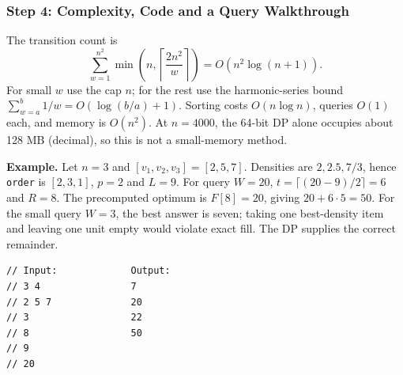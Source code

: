 \subsubsection*{Step 4: Complexity, Code and a Query Walkthrough}
The transition count is
\[
 \sum_{w=1}^{n^2}\min\left(n,
              \left\lceil\frac{2n^2}{w}\right\rceil\right)
 =O(n^2\log(n+1)).
\]
For small $w$ use the cap $n$; for the rest use the harmonic-series
bound $\sum_{w=a}^{b}1/w=O(\log(b/a)+1)$.
Sorting costs $O(n\log n)$, queries $O(1)$ each, and memory is
$O(n^2)$. At $n=4000$, the 64-bit DP alone occupies about 128 MB
(decimal), so this is not a small-memory method.

\textbf{Example.} Let $n=3$ and $[v_1,v_2,v_3]=[2,5,7]$.
Densities are $2,2.5,7/3$, hence \texttt{order} is $[2,3,1]$,
$p=2$ and $L=9$. For query $W=20$,
$t=\lceil(20-9)/2\rceil=6$ and $R=8$.
The precomputed optimum is $F[8]=20$, giving
$20+6\cdot5=50$. For the small query $W=3$, the best answer is
seven; taking one best-density item and leaving one unit empty
would violate exact fill. The DP supplies the correct remainder.
\newpage

\begin{minipage}{\linewidth}
\begin{lstlisting}[style=C++,showstringspaces=false]
// Input:             Output:
// 3 4                7
// 2 5 7              20
// 3                  22
// 8                  50
// 9
// 20
\end{lstlisting}
\end{minipage}
\par
\par
\endgroup
